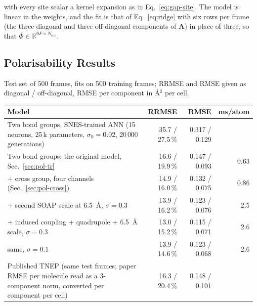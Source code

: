 \documentclass[11pt,a4paper]{article}
\begin{document}
with every site scalar a kernel expansion as in Eq.~\ref{eq:gap-site}. The model is linear in
the weights, and the fit is that of Eq.~\ref{eq:ridge} with six rows per frame (the three diagonal
and three off-diagonal components of $\mathbf{A}$) in place of three, so that
$\Phi \in \mathbb{R}^{6F \times N_{\mathrm{col}}}$.

\subsection{Polarisability Results}\label{sec:pol-results}

Test set of 500 frames, fits on 500 training frames; RRMSE and RMSE given as diagonal /
off-diagonal, RMSE per component in \AA$^3$ per cell.

\begin{center}
\begin{tabular}{p{6.0cm}rrr}
\hline
Model & RRMSE & RMSE & ms/atom \\
\hline
Two bond groups, SNES-trained ANN (15 neurons, 25\,k parameters, $\sigma_0=0.02$, 20\,000 generations) & 35.7 / 27.5\,\% & 0.317 / 0.129 & \\
Two bond groups: the original model, Sec.~\ref{sec:pol-tr} & 16.6 / 19.9\,\% & 0.147 / 0.093 & 0.63 \\
+ cross group, four channels (Sec.~\ref{sec:pol-cross}) & 14.9 / 16.0\,\% & 0.132 / 0.075 & 0.86 \\
+ second SOAP scale at 6.5~\AA{}, $\sigma=0.3$ & 13.9 / 16.2\,\% & 0.123 / 0.076 & 2.5 \\
+ induced coupling + quadrupole + 6.5~\AA{} scale, $\sigma=0.3$ & 13.0 / 15.2\,\% & 0.115 / 0.071 & 2.6 \\
\quad same, $\sigma=0.1$ & 13.9 / 14.6\,\% & 0.123 / 0.068 & 2.6 \\
Published TNEP (same test frames; paper RMSE per molecule read as a 3-component norm, converted per component per cell) & 16.3 / 20.4\,\% & 0.148 / 0.101 & \\
\hline
\end{tabular}
\end{center}
\end{document}
